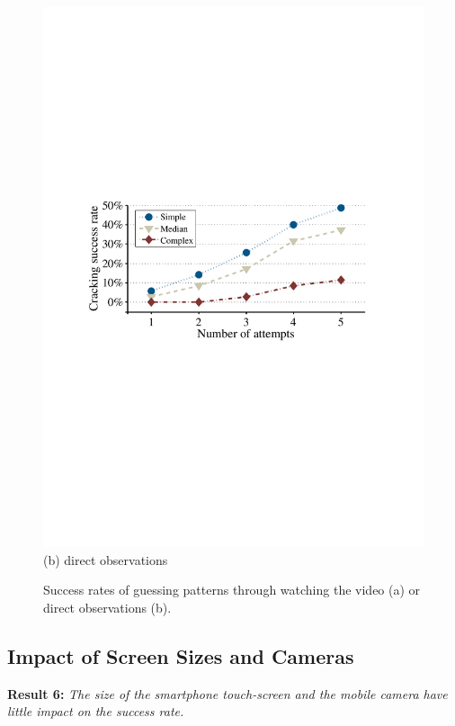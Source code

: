 \begin{figure}[!t]
{\begin{minipage}[t]{0.45\textwidth}
                \includegraphics[width=\textwidth]{fig/look-finger.pdf}\\
                \centering  (b) direct observations
                \end{minipage}
            }
            \vspace{-2mm}
            \caption{Success rates of guessing patterns through watching the video (a) or direct observations (b).}
            \label{fig:look-unlocking process}
        \end{figure}

    \subsection{Impact of Screen Sizes and Cameras}
    \label{section: screen-size and cameras}
    \noindent \textbf{Result 6:} \emph{The size of the smartphone touch-screen and the mobile camera have little impact on the success rate.}

